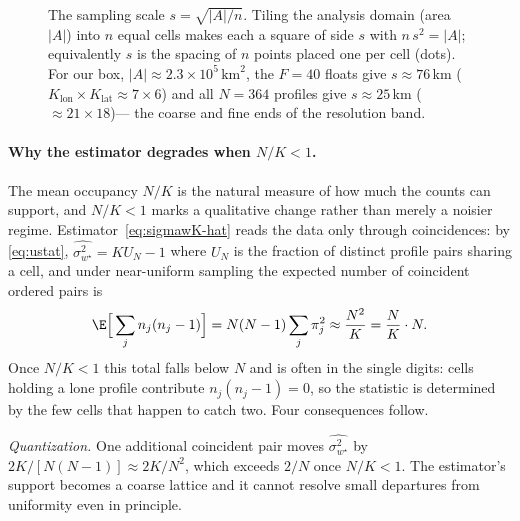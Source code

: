\begin{figure}[t]
\centering
{}
\caption{The sampling scale $s=\sqrt{|A|/n}$. Tiling the analysis domain
(area $|A|$) into $n$ equal cells makes each a square of side $s$ with
$n\,s^{2}=|A|$; equivalently $s$ is the spacing of $n$ points placed one
per cell (dots). For our box,
$|A|\approx2.3\times10^{5}\,\mathrm{km}^2$, the $F=40$ floats give
$s\approx76$\,km ($K_{\mathrm{lon}}\times K_{\mathrm{lat}}\approx7\times6$)
and all $N=364$ profiles give $s\approx25$\,km (${\approx}21\times18$)---%
the coarse and fine ends of the resolution band.}
\label{fig:sampling-scale}
\end{figure}

\paragraph{Why the estimator degrades when $N/K<1$.} The mean occupancy
$N/K$ is the natural measure of how much the counts can support, and
$N/K<1$ marks a qualitative change rather than merely a noisier regime.
Estimator~\eqref{eq:sigmawK-hat} reads the data only through
coincidences: by \eqref{eq:ustat}, $\widehat{\sigma_{w^{\star}}^2}=K U_N-1$
where $U_N$ is the fraction of distinct profile pairs sharing a cell, and
under near-uniform sampling the expected number of coincident ordered
pairs is
\[
  \E\Big[\sum_j n_j(n_j-1)\Big]=N(N-1)\sum_j\pi_j^2\approx\frac{N^2}{K}
  =\frac{N}{K}\cdot N .
\]
Once $N/K<1$ this total falls below $N$ and is often in the single
digits: cells holding a lone profile contribute $n_j(n_j-1)=0$, so the
statistic is determined by the few cells that happen to catch two. Four
consequences follow.

\emph{Quantization.} One additional coincident pair moves
$\widehat{\sigma_{w^{\star}}^2}$ by $2K/[N(N-1)]\approx 2K/N^2$, which
exceeds $2/N$ once $N/K<1$. The estimator's support becomes a coarse
lattice and it cannot resolve small departures from uniformity even in
principle.

